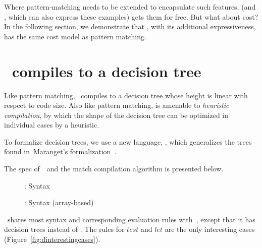 \documentclass[runningheads]{llncs}
\begin{document}
Where pattern-matching needs to be extended to encapsulate such features,
\VMinus (and \VC, which can also express these examples) gets them for free. %
But what about cost? %
In the following section, we demonstrate that \VMinus, with its additional
expressiveness, has the same cost model as pattern matching. %

\section{\VMinus~compiles to a decision tree}
\label{d}

Like pattern matching, \VMinus~compiles to a decision tree whose height is 
linear with respect to code size. %
Also like pattern matching, \VMinus is amenable to \textit{heuristic
compilation}\cite{macqueen1985tree}, by which the shape of the decision tree can be
optimized in individual cases by a heuristic. %

To formalize decision trees, we use a new language, \D, which generalizes the
trees found in~Maranget's formalization~\cite{maranget}. %

The spec of~\D~and the match compilation algorithm is presented below. %

  \begin{figure}[t]
    \scriptsize
    \begin{center}
    \dcsyntax
    \end{center}
    \caption{\D: Syntax}
    \label{fig:dsyntax}
    \end{figure}

  \begin{figure}[t]
    \scriptsize
    \begin{center}
    \dcsyntaxarray
    \end{center}
    \caption{\D: Syntax (array-based)}
    \label{fig:dsyntax-array}
    \end{figure}

  \D~shares most syntax and corresponding evaluation rules with~\VMinus, except
  that it has decision trees instead of \iffibf. The rules for $test$ and $let$
  are the only interesting cases (Figure~\ref{fig:dinterestingcases}).
\end{document}
